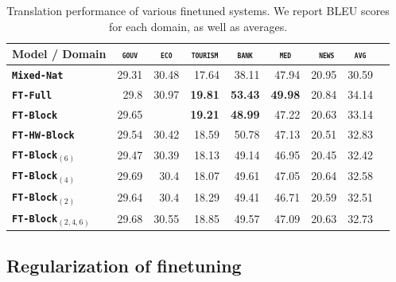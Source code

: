 \documentclass[11pt,a4paper]{article}
\newcommand{\fyDone}[1]{\done[FY]\Todo[FY:]{\textcolor{orange}{#1}}}
\newcommand{\domain}[1]{\texttt{\textsc{#1}}}
\newcommand{\system}[1]{\texttt{\textbf{#1}}}
\newcommand{\SB}[1]{\textbf{#1}}
\begin{document}
\begin{table}
  \centering
  \fyDone{Fix column size}
  \begin{tabular}{|p{3cm}|*{8}{r|}} \hline
    Model / Domain & \multicolumn{1}{c|}{\domain{gouv}} & \multicolumn{1}{c|}{\domain{eco}} & \multicolumn{1}{c|}{\domain{tourism}} & \multicolumn{1}{c|}{\domain{bank}} & \multicolumn{1}{c|}{\domain{ med }} & \multicolumn{1}{c|}{\domain{ news}} & \multicolumn{1}{c|}{\domain{avg}} \\ \hline %
    \system{Mixed-Nat}  & 29.31 & 30.48 & 17.64 & 38.11 & 47.94 & 20.95  & 30.59 \\
    \system{FT-Full}       & 29.8 & 30.97 & \SB{19.81} & \SB{53.43} & \SB{49.98} & 20.84 & 34.14 \\
   \system{FT-Block}     & 29.65 &  & \SB{19.21} & \SB{48.99} & 47.22 & 20.63 & 33.14 \\ 
   \system{FT-HW-Block}   & 29.54 & 30.42 & 18.59 & 50.78 & 47.13 & 20.51 & 32.83 \\ 
   \system{FT-Block$_{(6)}$}     & 29.47 & 30.39 & 18.13 & 49.14 & 46.95 & 20.45 & 32.42 \\
   \system{FT-Block$_{(4)}$}     & 29.69 & 30.4 & 18.07 & 49.61 & 47.05 & 20.64 & 32.58 \\
   \system{FT-Block$_{(2)}$}   & 29.64 & 30.4 & 18.29 & 49.41 & 46.71 & 20.59 & 32.51  \\
   \system{FT-Block$_{(2,4,6)}$}  & 29.68  & 30.55 & 18.85 & 49.57 & 47.09 & 20.63 &  32.73  \\
     \hline
  \end{tabular}
  \caption{Translation performance of various finetuned systems. We report BLEU scores for each domain, as well as averages.}
  \label{tab:performance-en-de}
\end{table}

\subsection{Regularization of finetuning}
\end{document}
